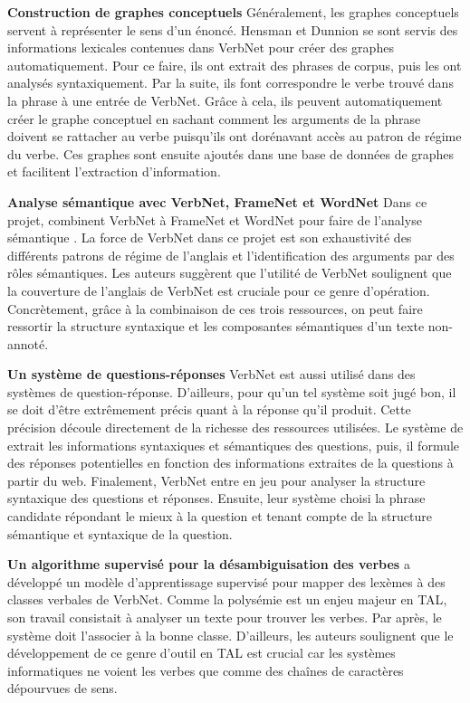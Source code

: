 \textbf{Construction de graphes conceptuels}
Généralement, les graphes conceptuels servent à représenter le sens d'un énoncé. Hensman et Dunnion se sont servis des informations lexicales contenues dans VerbNet pour créer des graphes automatiquement\citep{HensmanAutomaticallyBuildingConceptual2004}. Pour ce faire, ils ont extrait des phrases de corpus, puis les ont analysés syntaxiquement. Par la suite, ils font correspondre le verbe trouvé dans la phrase à une entrée de VerbNet. Grâce à cela, ils peuvent automatiquement créer le graphe conceptuel en sachant comment les arguments de la phrase doivent se rattacher au verbe puisqu'ils ont dorénavant accès au patron de régime du verbe. Ces graphes sont ensuite ajoutés dans une base de données de graphes et facilitent l'extraction d'information.

\textbf{Analyse sémantique avec VerbNet, FrameNet et WordNet}
Dans ce projet, \cite{Shi:2005:PPT:2132047.2132058} combinent VerbNet à FrameNet et WordNet pour faire de l'analyse sémantique . La force de VerbNet dans ce projet est son exhaustivité des différents patrons de régime de l'anglais et l'identification des arguments par des rôles sémantiques. Les auteurs suggèrent que l'utilité de VerbNet soulignent que la couverture de l'anglais de VerbNet est cruciale pour ce genre d'opération. Concrètement, grâce à la combinaison de ces trois ressources, on peut faire ressortir la structure syntaxique et les composantes sémantiques d'un texte non-annoté.

\textbf{Un système de questions-réponses}
VerbNet est aussi utilisé dans des systèmes de question-réponse. D'ailleurs, pour qu'un tel système soit jugé bon, il se doit d'être extrêmement précis quant à la réponse qu'il produit. Cette précision découle directement de la richesse des ressources utilisées. Le système de \cite{DBLP:conf/nlpke/WenJH08} extrait les informations syntaxiques et sémantiques des questions, puis, il formule des réponses potentielles en fonction des informations extraites de la questions à partir du web. Finalement, VerbNet entre en jeu pour analyser la structure syntaxique des questions et réponses. Ensuite, leur système choisi la phrase candidate répondant le mieux à la question et tenant compte de la structure sémantique et syntaxique de la question.

\textbf{Un algorithme supervisé pour la désambiguisation des verbes}
\cite{AbendSupervisedAlgorithmVerb2008} a développé un modèle d'apprentissage supervisé pour mapper des lexèmes à des classes verbales de VerbNet. Comme la polysémie est un enjeu majeur en \ac{TAL}, son travail consistait à analyser un texte pour trouver les verbes. Par après, le système doit l'associer à la bonne classe. D'ailleurs, les auteurs soulignent que le développement de ce genre d'outil en \ac{TAL} est crucial car les systèmes informatiques ne voient les verbes que comme des chaînes de caractères dépourvues de sens.

